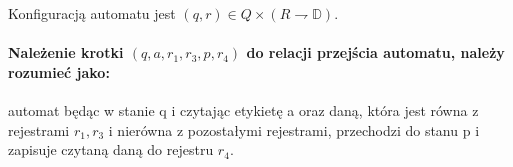 \documentclass[a4paper,12pt]{report}
\newcommand{\data}{\mathbb D}
\begin{document}
Konfiguracją automatu jest $(q,r) \in Q \times (R \rightharpoondown \data)$.

\paragraph {Należenie krotki $(q,a,r_1,r_3,p,r_4)$ do relacji przejścia automatu, należy rozumieć jako:} automat będąc w stanie q i czytając etykietę a oraz daną, która jest równa z rejestrami $r_1,r_3$ i nierówna z pozostałymi rejestrami, przechodzi do stanu p i zapisuje czytaną daną do rejestru $r_4$.
\end{document}
